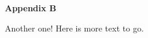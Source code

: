 \noindent \textbf{Appendix B}
\vspace{12pt}

\noindent Another one! Here is more text to go.
\newpage

